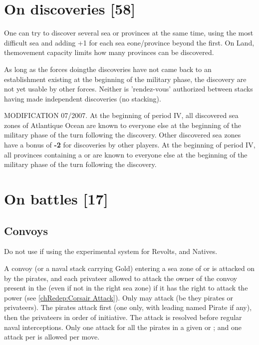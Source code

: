 \section{On discoveries [58]}\label{chMilitary:Discoveries}
\aparag One can try to discover several sea or provinces at the same time, using the most difficult
sea and adding +1 for each sea eone/province beyond the first. On Land, themovement capacity
limits how many provinces can be discovered.

\aparag As long as the forces doingthe discoveries have not came back to an establishment
existing at the beginning of the military phase, the discovery are not yet usable by other forces.
Neither is 'rendez-vous' authorized between stacks having made independent discoveries (no
stacking).

MODIFICATION 07/2007.
\bparag[On sea] At the beginning of period IV, all discovered sea zones of Atlantique
Ocean are known to everyone else at the beginning of the military phase of the turn following the discovery. Other discovered sea zones have a bonus of {\bf -2} for discoveries by other players.
\bparag [On land] At the beginning of period IV, all provinces containing a \COL or \TP are known to
everyone else at the beginning of the military phase of the turn following the discovery.



\section{On battles [17]}

\subsection{Convoys}\label{chMilitary:Convoys}
Do not use if using the experimental system for Revolts, \corsaire and Natives.

A convoy (or a naval stack carrying Gold)
entering a sea zone of \STZ or \CTZ is attacked on
 by the pirates, and each
privateer allowed to attack the owner of the convoy present in the \STZ
(even if not in the right sea zone) if it has the right to attack the
power (see \ref{chRedep:Corsair Attack}).
\bparag Only \corsaire\faceplus may attack (be they pirates or
privateers).
\bparag The pirates attack first (one only, with leading
named Pirate if any), then the privateers in order of initiative. The
attack is resolved before regular naval interceptions.
\bparag Only one attack for all the pirates in a given \STZ or \CTZ; and
one attack per \corsaire is allowed per move.

